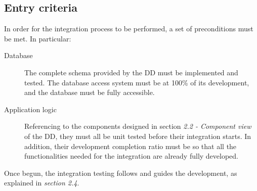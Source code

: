 \subsection{Entry criteria}
\label{sec:entry_criteria}
	In order for the integration process to be performed, a set of preconditions must be met. In particular:
	\begin{description}
		\item[Database] The complete schema provided by the DD must be implemented and tested. The database access system must be at 100\% of its development, and the database must be fully accessible.
		\item[Application logic] Referencing to the components designed in section \textit{2.2 - Component view} of the DD, they must all be unit tested before their integration starts. In addition, their development completion ratio must be so that all the functionalities needed for the integration are already fully developed. 
	\end{description}
	Once begun, the integration testing follows and guides the development, as explained in \textit{section 2.4}. %

